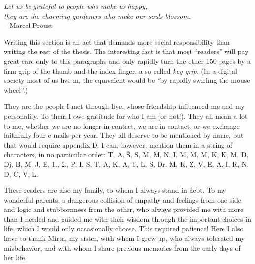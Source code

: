 \cleardoublepage


\begin{acknowledgements}

\narrowlinespacing
\begin{myquote}
\begin{flushright}
\textit{Let us be grateful to people who make us happy,\\they are the charming gardeners who make our souls blossom.} \\-- Marcel Proust
\end{flushright}
\end{myquote}
\normallinespacing

Writing this section is an act that demands more social responsibility than writing the rest of the thesis. The interesting fact is that most “readers” will pay great care only to this paragraphs and only rapidly turn the other 150 pages by a firm grip of the thumb and the index finger, a so called \emph{key grip}. (In a digital society most of us live in, the equivalent would be “by rapidly swirling the mouse wheel”.)

They are the people I met through live, whose friendship influenced me and my personality. To them I owe gratitude for who I am (or not!). They all mean a lot to me, whether we are no longer in contact, we are in contact, or we exchange faithfully four e-mails per year. They all deserve to be mentioned by name, but that would require appendix D. I can, however, mention them in a string of characters, in no particular order: T, A, Š, S, M, M, N, I, M, M, M, K, K, M, D, Dj, B, M, J, E, 1., 2., P, I, S, T, A, K, A, T, L, S, Dr. M, K, Z, V, E, A, I, R, N, D, C, V, L.

These readers are also my family, to whom I always stand in debt. To my wonderful parents, a dangerous collision of empathy and feelings from one side and logic and stubbornness from the other, who always provided me with more than I needed and guided me with their wisdom through the important choices in life, which I would only occasionally choose. This required patience! Here I also have to thank Mirta, my sister, with whom I grew up, who always tolerated my misbehavior, and with whom I share precious memories from the early days of her life. 


\end{acknowledgements}
